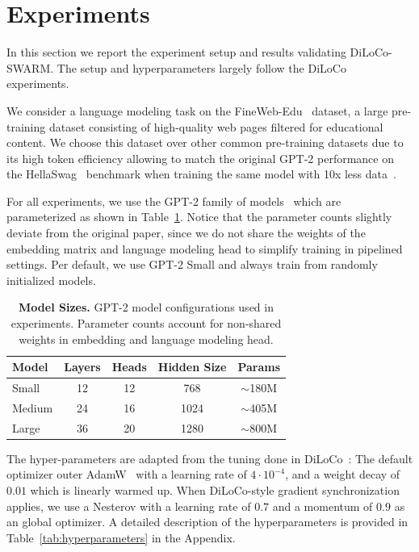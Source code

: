 \documentclass{article}
\begin{document}
\section{Experiments}

In this section we report the experiment setup and results validating
DiLoCo-SWARM. The setup and hyperparameters largely follow the
DiLoCo~\cite{douillard2023diloco} experiments.

We consider a language modeling task on the FineWeb-Edu~\cite{penedo2024fineweb}
dataset, a large pre-training dataset consisting of high-quality web pages
filtered for educational content. We choose this dataset over other common
pre-training datasets due to its high token efficiency allowing to match the
original GPT-2 performance on the
HellaSwag~\cite{zellers2019hellaswag} benchmark when training the same model with 10x
less data~\cite{karpathy2024nanogpt}.

For all experiments, we use the GPT-2 family of models~\cite{radford2019gpt2} which
are parameterized as shown in Table~\ref{tab:models}. Notice that the parameter 
counts slightly deviate from the original paper, since we do not share the 
weights of the embedding matrix and language modeling head to simplify training
in pipelined settings. Per default, we use GPT-2 Small and always train from 
randomly initialized models.

\begin{table}[h]
\centering
\begin{tabular}{lcccc}
\toprule
\textbf{Model} & \textbf{Layers} & \textbf{Heads} & \textbf{Hidden Size} & \textbf{Params} \\
\midrule
Small & 12 & 12 & 768 & $\sim$180M \\
Medium & 24 & 16 & 1024 & $\sim$405M \\
Large & 36 & 20 & 1280 & $\sim$800M \\
\bottomrule
\end{tabular}
\caption{\textbf{Model Sizes.} GPT-2 model configurations used in experiments.
Parameter counts account for non-shared weights in embedding and language
modeling head.}
\label{tab:models}
\end{table}

The hyper-parameters are adapted from the tuning done in
DiLoCo~\cite{douillard2023diloco}: The default optimizer outer
AdamW~\cite{loshchilov2019adamw} with a learning rate of $4\cdot 10^{-4}$, and a
weight decay of $0.01$ which is linearly warmed up. When DiLoCo-style gradient
synchronization applies, we use a Nesterov with a learning rate of $0.7$ and a
momentum of $0.9$ as an global optimizer. A detailed description of the
hyperparameters is provided in Table~\ref{tab:hyperparameters} in the Appendix.
\end{document}
